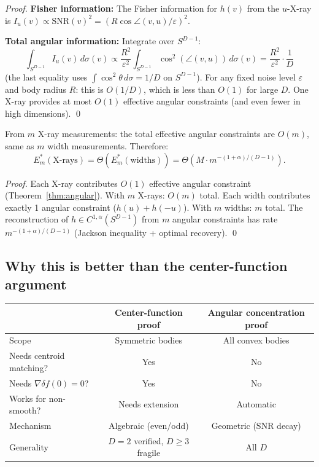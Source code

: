 \begin{proof}
\textbf{Fisher information:} The Fisher information for $h(v)$ from the $u$-X-ray is $I_u(v) \propto \text{SNR}(v)^2 = (R\cos\angle(v,u)/\varepsilon)^2$.

\textbf{Total angular information:} Integrate over $S^{D-1}$:
\[
  \int_{S^{D-1}} I_u(v) \, d\sigma(v) \propto \frac{R^2}{\varepsilon^2} \int_{S^{D-1}} \cos^2(\angle(v, u)) \, d\sigma(v) = \frac{R^2}{\varepsilon^2} \cdot \frac{1}{D}
\]
(the last equality uses $\int \cos^2\theta \, d\sigma = 1/D$ on $S^{D-1}$). For any fixed noise level $\varepsilon$ and body radius $R$: this is $O(1/D)$, which is less than $O(1)$ for large $D$. One X-ray provides at most $O(1)$ effective angular constraints (and even fewer in high dimensions). \qed
\end{proof}

\begin{corollary}
From $m$ X-ray measurements: the total effective angular constraints are $O(m)$, same as $m$ width measurements. Therefore:
\[
  E_m^*(\text{X-rays}) = \Theta(E_m^*(\text{widths})) = \Theta(M \cdot m^{-(1+\alpha)/(D-1)}).
\]
\end{corollary}

\begin{proof}
Each X-ray contributes $O(1)$ effective angular constraint (Theorem~\ref{thm:angular}). With $m$ X-rays: $O(m)$ total. Each width contributes exactly 1 angular constraint ($h(u) + h(-u)$). With $m$ widths: $m$ total. The reconstruction of $h \in C^{1,\alpha}(S^{D-1})$ from $m$ angular constraints has rate $m^{-(1+\alpha)/(D-1)}$ (Jackson inequality + optimal recovery). \qed
\end{proof}

\subsection{Why this is better than the center-function argument}

\begin{center}
\renewcommand{\arraystretch}{1.3}
\begin{tabular}{lcc}
\toprule
 & \textbf{Center-function proof} & \textbf{Angular concentration proof} \\
\midrule
Scope & Symmetric bodies & All convex bodies \\
Needs centroid matching? & Yes & No \\
Needs $\nabla\delta f(0) = 0$? & Yes & No \\
Works for non-smooth? & Needs extension & Automatic \\
Mechanism & Algebraic (even/odd) & Geometric (SNR decay) \\
Generality & $D = 2$ verified, $D \geq 3$ fragile & All $D$ \\
\bottomrule
\end{tabular}
\end{center}

